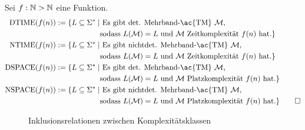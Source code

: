\begin{Def}[name={[$\NTIME$ Klasse]}]
	Sei $f:\mathbb{N}\->\mathbb{N}$ eine Funktion.
	\begin{align*}
	\DTIME(f(n)) := \{L \subseteq\Sigma^*\mid & \text{ Es gibt det. Mehrband-\ac{TM} $\M$,}\\
	                & \text{sodass $L(\M)=L$ und $\M$ Zeitkomplexität $f(n)$ hat.} \}\\
    \NTIME(f(n)) := \{L \subseteq\Sigma^*\mid & \text{ Es gibt nichtdet. Mehrband-\ac{TM} $\M$,}\\
                    & \text{sodass $L(\M)=L$ und $\M$ Zeitkomplexität $f(n)$ hat.} \}\\           
	\DSPACE(f(n)) := \{L \subseteq\Sigma^*\mid & \text{ Es gibt det. Mehrband-\ac{TM} $\M$,}\\
	                & \text{sodass $L(\M)=L$ und $\M$ Platzkomplexität $f(n)$ hat.} \}\\
    \NSPACE(f(n)) := \{L \subseteq\Sigma^*\mid & \text{ Es gibt nichtdet. Mehrband-\ac{TM} $\M$,}\\
                    & \text{sodass $L(\M)=L$ und $\M$ Platzkomplexität $f(n)$ hat.} \}\qedhere
    \end{align*}	

\end{Def}


\begin{figure}[htb]
	\begin{center}
	\end{center}
	\caption{Inklusionsrelationen zwischen Komplexitätsklassen}
\end{figure}


